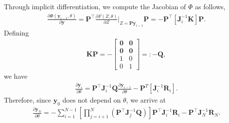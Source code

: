 \documentclass[12pt]{article}
\begin{document}
Through implicit differentiation, we compute the Jacobian of $\Phi$ as follows,
\begin{align*}
\frac{\partial \Phi(\bm{y}_{i-1}, \theta)}{\partial \bm{y}} = \mathbf{P}^{\intercal} \frac{\partial F(Z,\theta)}{\partial Z}\Big|_{Z = \mathbf{P} \bm{y}_{i-1}} \mathbf{P} = - \mathbf{P}^{\intercal} \left[ \mathbf{J}_i^{-1} \mathbf{K}  \right] \mathbf{P}.
\end{align*}
Defining 
\begin{align*}
	\mathbf{K}\mathbf{P} =  -
	\begin{bmatrix}
		\mathbf{0} & \mathbf{0} \\
		\mathbf{0} & \mathbf{0} \\
		1   &   0  \\
		0  &  1
	\end{bmatrix} =: -\mathbf{Q},
\end{align*}
we have 
\begin{align*}
	\frac{\partial \bm{y}_{i}}{\partial \theta} =   \mathbf{P}^{\intercal} \mathbf{J}_i^{-1}  \mathbf{Q} \frac{\partial \bm{y}_{i-1}}{\partial \theta} - \mathbf{P}^T \left[  \mathbf{J}_i^{-1} \mathbf{R}_i \right].
\end{align*}
Therefore, since $\bm{y}_0$ does not depend on $\theta$, we arrive at
\begin{align}\label{eqn:dydtheta-reccursive}
	\frac{\partial \bm{y}_{N}}{\partial \theta} =  - \sum_{i=1}^{N-1} \left[  \prod_{j=i+1}^N \left( \mathbf{P}^{\intercal} \mathbf{J}_j^{-1} \mathbf{Q}  \right) \right] \mathbf{P}^{\intercal} \mathbf{J}_i^{-1} \mathbf{R}_i - \mathbf{P}^{\intercal} \mathbf{J}_N^{-1} \mathbf{R}_N.
\end{align}
\end{document}
